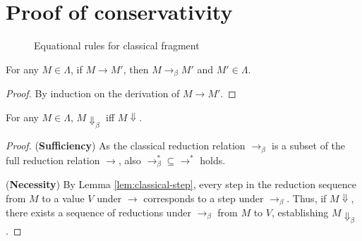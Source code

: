 \section{Proof of conservativity} \label{sec:conserv-proof}
\begin{figure}[h]
  \caption{Equational rules for classical fragment}
\end{figure}

\begin{lem} \label{lem:classical-step}
  For any $M \in \Lambda$, if $M \longrightarrow M'$, then $M \longrightarrow_\beta M'$ and $M' \in \Lambda$.
\end{lem}
\begin{proof}
  By induction on the derivation of $M \longrightarrow M'$.
\end{proof}

\begin{lem} \label{lem:classical-eval}
  For any $M \in \Lambda$, $M \Downarrow_\beta$ iff $M \Downarrow$.
\end{lem}
\begin{proof}
  (\textbf{Sufficiency})
  As the classical reduction relation $\longrightarrow_\beta$ is a subset of the full reduction relation $\longrightarrow$, also $\longrightarrow_\beta^* \subseteq \longrightarrow^*$ holds.

  (\textbf{Necessity})
  By Lemma \ref{lem:classical-step}, every step in the reduction sequence from $M$ to a value $V$ under $\longrightarrow$ corresponds to a step under $\longrightarrow_\beta$.
  Thus, if $M \Downarrow$, there exists a sequence of reductions under $\longrightarrow_\beta$ from $M$ to $V$, establishing $M \Downarrow_\beta$.
\end{proof}

